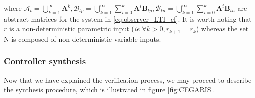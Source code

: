 \documentclass[runningheads,a4paper]{llncs}
\newcommand{\mat}[1]{\boldsymbol{#1}}
\begin{document}
%
where $\mathcal{A}_t=\bigcup_{k=1}^\infty \mat{A}^k, \mathcal{B}_{tp}=\bigcup_{k=1}^\infty \sum_{i=0}^k\mat{A}^i\mat{B}_{tp}, \mathcal{B}_{tn}=\bigcup_{k=1}^\infty \sum_{i=0}^k\mat{A}^i\mat{B}_{tn}$ are abstract matrices for the system in \eqref{eq:observer_LTI_cf}. It is worth noting that $r$ is a non-deterministic parametric input (\emph{ie} $\forall k>0, r_{k+1} =r_k$) whereas the set N is composed of non-deterministic variable inputs.


\subsubsection{Controller synthesis}\label{sec:cof_synth}
Now that we have explained the verification process, we may proceed to describe the synthesis procedure, which is illustrated in figure \ref{fig:CEGARIS}.
\end{document}
